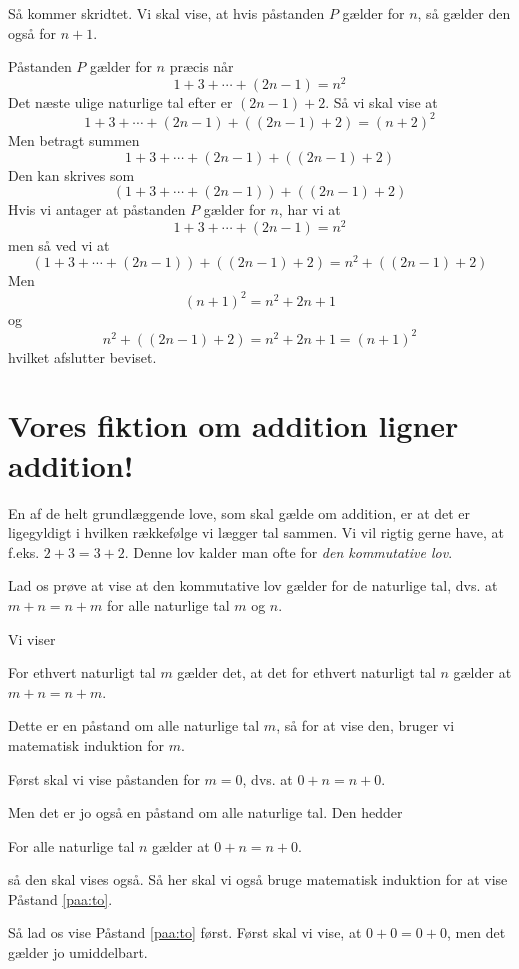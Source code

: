 Så kommer skridtet. Vi skal vise, at hvis påstanden $P$ gælder for $n$, så gælder den også for $n+1$.

Påstanden $P$ gælder for $n$ præcis når
%
\[ 1 + 3 + \cdots + (2n-1) = n^2 \]
%
Det næste ulige naturlige tal efter er $(2n-1) + 2$. Så vi skal vise at
%
\[  1 + 3 + \cdots + (2n-1) + ((2n-1)+2) = (n+2)^2 \] 
%
Men betragt summen 
%
\[  1 + 3 + \cdots + (2n-1) + ((2n-1)+2)\] 
%
Den kan skrives som 
%
\[  (1 + 3 + \cdots + (2n-1)) + ((2n-1)+2) \] 
%
Hvis vi antager at påstanden $P$ gælder for $n$, har vi at
%
\[ 1 + 3 + \cdots + (2n-1) = n^2 \]
%
men så ved vi at
%
\[  (1 + 3 + \cdots + (2n-1)) +  ((2n-1)+2) = n^2 + ((2n-1)+2) \] 
%
Men 
\[ (n+1)^2 = n^2 + 2n + 1 \]
og
\[  n^2 + ((2n-1)+2) = n^2 +2n + 1 = (n+1)^2 \] 
hvilket afslutter beviset.

\section{Vores fiktion om addition ligner addition!}

En af de helt grundlæggende love, som skal gælde om addition, er at det er ligegyldigt i hvilken rækkefølge vi lægger tal sammen. Vi vil rigtig gerne have, at f.eks. $2+3 = 3+2$. Denne lov kalder man ofte for \emph{den kommutative lov}. 

Lad os prøve at vise at den kommutative lov gælder for de naturlige tal, dvs. at $m+n = n +m$ for alle naturlige tal $m$ og $n$.

Vi viser

\begin{paastand}
For ethvert naturligt tal $m$ gælder det, at det for ethvert naturligt tal $n$ gælder at $m + n = n + m$.
\end{paastand}

Dette er en påstand om alle naturlige tal $m$, så for at vise den, bruger vi matematisk induktion for $m$.

Først skal vi vise påstanden for $m = 0$, dvs. at $0+n=n+0$.

Men det er jo også en påstand om alle naturlige tal. Den hedder

\begin{paastand}\label{paa:to}
For alle naturlige tal $n$ gælder at $0+n=n+0$.
\end{paastand}

så den skal vises også. Så her skal vi også bruge matematisk induktion for at vise Påstand \ref{paa:to}.

Så lad os vise Påstand \ref{paa:to} først. Først skal vi vise, at $0+0=0+0$, men det gælder jo umiddelbart.

